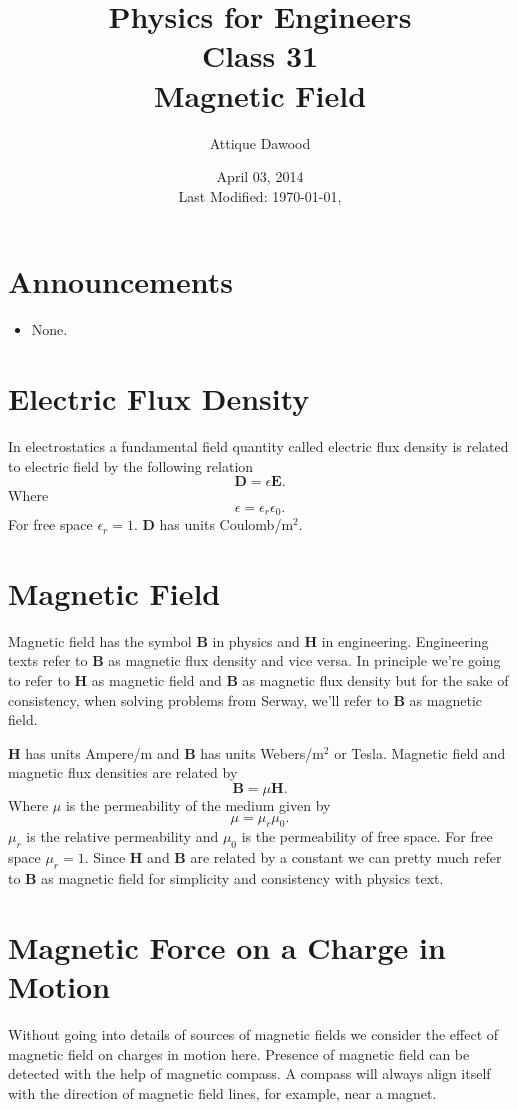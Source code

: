\documentclass[12pt,a4paper]{article}
\title{\vspace{-3cm}Physics for Engineers\\Class 31\\Magnetic Field}
\author{Attique Dawood}
\date{April 03, 2014\\[0.2cm] Last Modified: \today, \currenttime}
\begin{document}
\maketitle
\section{Announcements}
\begin{itemize}
\item None.
\end{itemize}
\section{Electric Flux Density}
In electrostatics a fundamental field quantity called electric flux density is related to electric field by the following relation
\begin{equation}
\textbf{D}=\epsilon\textbf{E}.
\end{equation}
Where
\begin{equation}
\epsilon=\epsilon_r\epsilon_0.
\end{equation}
For free space $\epsilon_r=1$. \textbf{D} has units Coulomb/m$^2$.
\section{Magnetic Field}
Magnetic field has the symbol \textbf{B} in physics and \textbf{H} in engineering. Engineering texts refer to \textbf{B} as magnetic flux density and vice versa. In principle we're going to refer to \textbf{H} as magnetic field and \textbf{B} as magnetic flux density but for the sake of consistency, when solving problems from Serway, we'll refer to \textbf{B} as magnetic field.

\textbf{H} has units Ampere/m and \textbf{B} has units Webers/m$^2$ or Tesla. Magnetic field and magnetic flux densities are related by
\begin{equation}
\textbf{B}=\mu\textbf{H}.
\end{equation}
Where $\mu$ is the permeability of the medium given by
\begin{equation}
\mu=\mu_r\mu_0.
\end{equation}
$\mu_r$ is the relative permeability and $\mu_0$ is the permeability of free space. For free space $\mu_r=1$. Since \textbf{H} and \textbf{B} are related by a constant we can pretty much refer to \textbf{B} as magnetic field for simplicity and consistency with physics text.
\section{Magnetic Force on a Charge in Motion}
Without going into details of sources of magnetic fields we consider the effect of magnetic field on charges in motion here. Presence of magnetic field can be detected with the help of magnetic compass. A compass will always align itself with the direction of magnetic field lines, for example, near a magnet.
\end{document}
